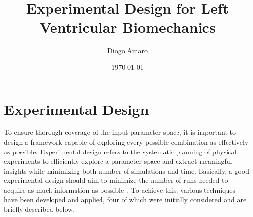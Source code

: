 \documentclass[a4paper,11pt]{article}
\title{Experimental Design for Left Ventricular Biomechanics}
\author{Diogo Amaro}
\date{\today}
\begin{document}
\maketitle

\section{Experimental Design}
\label{subsec:expdes}
To ensure thorough coverage of the input parameter space, it is important to design a framework capable of exploring every possible combination as effectively as possible. Experimental design refers to the systematic planning of physical experiments to efficiently explore a parameter space and extract meaningful insights while minimizing both number of simulations and time. Basically, a good experimental design should aim to minimize the number of runs needed to acquire as much information as possible~\cite{fang2005design}. To achieve this, various techniques have been developed and applied, four of which were initially considered and are briefly described below.
\end{document}
